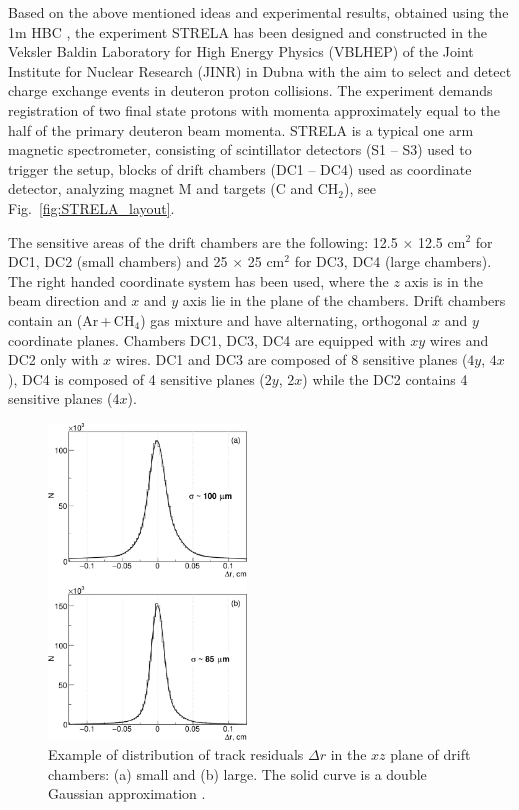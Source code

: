 \documentclass[twocolumn,epjc3]{svjour3}
\begin{document}
Based on the above mentioned ideas and experimental results, obtained using the
1m HBC \cite{gla02,gla08}, the experiment STRELA has been designed and
constructed in the Veksler Baldin Laboratory for High Energy Physics (VBLHEP) of
the Joint Institute for Nuclear Research (JINR) in Dubna with the aim to select
and detect charge exchange events in deuteron proton collisions. The experiment
demands registration of two final state protons with momenta approximately equal
to the half of the primary deuteron beam momenta. STRELA is a typical one arm
magnetic spectrometer, consisting of scintillator detectors (S1 -- S3) used to
trigger the setup, blocks of drift chambers (DC1 -- DC4) used as coordinate
detector, analyzing magnet M and targets (C and CH$_2$), see
Fig.~\ref{fig:STRELA_layout}.

The sensitive areas of the drift chambers are the following: 12.5 $\times$ 12.5
cm$^2$ for DC1, DC2 (small chambers) and 25 $\times$ 25 cm$^2$ for DC3, DC4
(large chambers). The right handed coordinate system has been used, where the
$z$ axis is in the beam direction and $x$ and $y$ axis lie in the plane of the
chambers. Drift chambers contain an (Ar\,+\,CH$_4$) gas mixture and have
alternating, orthogonal $x$ and $y$ coordinate planes. Chambers DC1, DC3, DC4
are equipped with $xy$ wires and DC2 only with $x$ wires. DC1 and DC3 are
composed of 8 sensitive planes ($4y$, $4x$), DC4 is composed of 4 sensitive
planes ($2y$, $2x$) while the DC2 contains 4 sensitive planes ($4x$).

\begin{figure}[t]
  \centering
  \includegraphics[width=0.47\textwidth]{res_chambers.pdf}
  \caption{Example of distribution of track residuals $\Delta r$ in the $xz$
    plane of drift chambers: (a) small and (b) large. The solid curve is a
    double Gaussian approximation \cite{gla13}.}
  \label{fig:res_chambers}
\end{figure}
\end{document}

